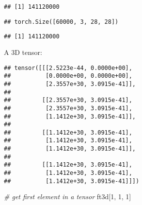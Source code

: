 \documentclass[]{book}
\newenvironment{Shaded}{\begin{snugshade}}{\end{snugshade}}
\newcommand{\CommentTok}[1]{\textcolor[rgb]{0.56,0.35,0.01}{\textit{#1}}}
\newcommand{\DecValTok}[1]{\textcolor[rgb]{0.00,0.00,0.81}{#1}}
\newcommand{\KeywordTok}[1]{\textcolor[rgb]{0.13,0.29,0.53}{\textbf{#1}}}
\newcommand{\NormalTok}[1]{#1}
\newcommand{\OperatorTok}[1]{\textcolor[rgb]{0.81,0.36,0.00}{\textbf{#1}}}
\newcommand{\StringTok}[1]{\textcolor[rgb]{0.31,0.60,0.02}{#1}}
\begin{document}
\begin{verbatim}
## [1] 141120000
\end{verbatim}

\begin{Shaded}
\end{Shaded}

\begin{verbatim}
## torch.Size([60000, 3, 28, 28])
\end{verbatim}

\begin{Shaded}
\end{Shaded}

\begin{verbatim}
## [1] 141120000
\end{verbatim}

A 3D tensor:

\begin{Shaded}
\end{Shaded}

\begin{verbatim}
## tensor([[[2.5223e-44, 0.0000e+00],
##          [0.0000e+00, 0.0000e+00],
##          [2.3557e+30, 3.0915e-41]],
## 
##         [[2.3557e+30, 3.0915e-41],
##          [2.3557e+30, 3.0915e-41],
##          [1.1412e+30, 3.0915e-41]],
## 
##         [[1.1412e+30, 3.0915e-41],
##          [1.1412e+30, 3.0915e-41],
##          [1.1412e+30, 3.0915e-41]],
## 
##         [[1.1412e+30, 3.0915e-41],
##          [1.1412e+30, 3.0915e-41],
##          [1.1412e+30, 3.0915e-41]]])
\end{verbatim}

\begin{Shaded}
\begin{Highlighting}[]
\CommentTok{# get first element in a tensor}
\NormalTok{ft3d[}\DecValTok{1}\NormalTok{, }\DecValTok{1}\NormalTok{, }\DecValTok{1}\NormalTok{]}
\end{Highlighting}
\end{Shaded}
\end{document}
